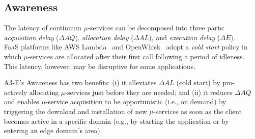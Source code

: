 


\subsection{Awareness}\label{sec:A3-E-awareness}






The latency of continuum $\mu$-services can be decomposed into three parts: \textit{acquisition delay} ($\Delta AQ$), \textit{allocation delay} ($\Delta AL$), and \textit{execution delay} ($\Delta E$). FaaS platforms like AWS Lambda~\cite{AWSLambda}
and OpenWhisk~\cite{OpenWhisk} adopt a \textit{cold start} policy in which $\mu$-services are allocated after their first call following a period of idleness. This latency, however, may be disruptive for some applications. 

A3-E's Awareness has two benefits: (i) it alleviates $\Delta AL$ (cold start) by pro-actively allocating $\mu$-services just before they are needed; and (ii) it reduces $\Delta AQ$ and enables $\mu$-service acquisition to be opportunistic (i.e., on demand) by triggering the download and installation of new $\mu$-services as soon as the client becomes active in a specific domain (e.g., by starting the application or by entering an edge domain's area).


